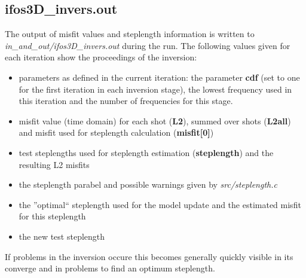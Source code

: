 \subsection{ifos3D\_invers.out}
The output of misfit values and steplength information is written to \textit{in\_and\_out/ifos3D\_invers.out} during the run. The following values given for each iteration show the proceedings of the inversion:
\begin{itemize}
\item parameters as defined in the current iteration: the parameter \textbf{cdf} (set to one for the first iteration in each inversion stage), the lowest frequency used in this iteration and the number of frequencies for this stage. 
 \item misfit value (time domain) for each shot (\textbf{L2}), summed over shots (\textbf{L2all}) and misfit used for steplength calculation (\textbf{misfit[0]})
 \item test steplengths used for steplength estimation (\textbf{steplength}) and the resulting L2 misfits
 \item the steplength parabel and possible warnings given by \textit{src/steplength.c}
 \item the ''optimal`` steplength used for the model update and the estimated misfit for this steplength
 \item the new test steplength
\end{itemize}
If problems in the inversion occure this becomes generally quickly visible in its converge and in problems to find an optimum steplength.

